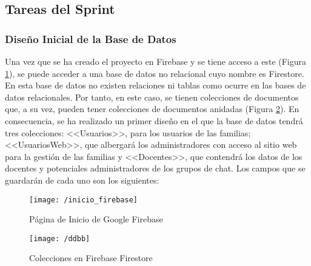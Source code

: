 \begin{table}[!htbp]
	\centering
	{\small
		
	}
	\caption[Historia de Usuario 1]
	{Historia de Usuario 1}
	\label{tab:historia1}
\end{table}

\clearpage

\begin{table}[!htbp]
	\centering
	{\small
		
	}
	\caption[Historia de Usuario 2]
	{Historia de Usuario 2}
	\label{tab:historia2}
\end{table}

\subsection{Tareas del Sprint}
\subsubsection{Diseño Inicial de la Base de Datos}
Una vez que se ha creado el proyecto en Firebase y se tiene acceso a este (Figura \ref{fig:iniciofirebase}), se puede acceder a una base de datos no relacional cuyo nombre es Firestore. En esta base de datos no existen relaciones ni tablas como ocurre en las bases de datos relacionales. Por tanto, en este caso, se tienen colecciones de documentos que, a su vez, pueden tener colecciones de documentos anidadas (Figura \ref{fig:bbdd}). En consecuencia, se ha realizado un primer diseño en el que la base de datos tendrá tres colecciones: <<Usuarios>>, para los usuarios de las familias; <<UsuariosWeb>>, que albergará los administradores con acceso al sitio web para la gestión de las familias y <<Docentes>>, que contendrá los datos de los docentes y potenciales administradores de los grupos de chat. Los campos que se guardarán de cada uno son los siguientes:

\begin{figure}[!h]
	\begin{center}
		\texttt{[image: /inicio\_firebase]}
		\caption{Página de Inicio de Google Firebase}
		\label{fig:iniciofirebase}
	\end{center}
\end{figure}

\begin{figure}[!h]
	\begin{center}
		\texttt{[image: /ddbb]}
		\caption{Colecciones en Firebase Firestore}
		\label{fig:bbdd}
	\end{center}
\end{figure}

